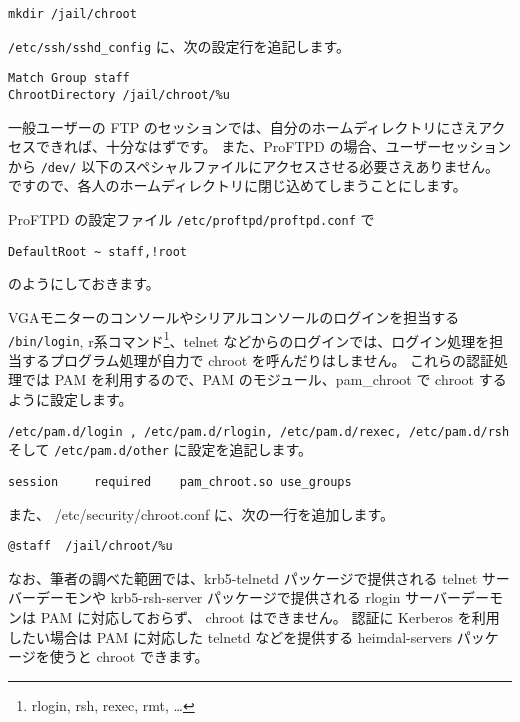 \begin{verbatim}
mkdir /jail/chroot
\end{verbatim}


\label{sec:openssh}

{\tt /etc/ssh/sshd\_config} に、次の設定行を追記します。
\begin{tabbing}
\tt Match \= \tt Group staff \\
\> \tt ChrootDirectory /jail/chroot/\%u
\end{tabbing}



一般ユーザーの FTP のセッションでは、自分のホームディレクトリにさえアクセスできれば、十分なはずです。
また、ProFTPD の場合、ユーザーセッションから {\tt /dev/} 以下のスペシャルファイルにアクセスさせる必要さえありません。
ですので、各人のホームディレクトリに閉じ込めてしまうことにします。

ProFTPD の設定ファイル {\tt /etc/proftpd/proftpd.conf} で
\begin{verbatim}
DefaultRoot	~ staff,!root
\end{verbatim}
のようにしておきます。



\label{sec:pamchroot}

VGAモニターのコンソールやシリアルコンソールのログインを担当する {\tt /bin/login}, r系コマンド\footnote{rlogin, rsh, rexec, rmt, \ldots}、telnet などからのログインでは、ログイン処理を担当するプログラム処理が自力で chroot を呼んだりはしません。
これらの認証処理では PAM を利用するので、PAM のモジュール、pam\_chroot で chroot するように設定します。

 {\tt /etc/pam.d/login , /etc/pam.d/rlogin, /etc/pam.d/rexec, /etc/pam.d/rsh} そして {\tt /etc/pam.d/other} に設定を追記します。

\begin{verbatim}
session		required	pam_chroot.so use_groups
\end{verbatim}


また、 /etc/security/chroot.conf に、次の一行を追加します。
\begin{verbatim}
@staff  /jail/chroot/%u
\end{verbatim}


なお、筆者の調べた範囲では、krb5-telnetd パッケージで提供される telnet サーバーデーモンや krb5-rsh-server パッケージで提供される rlogin サーバーデーモンは PAM に対応しておらず、 chroot はできません。
認証に Kerberos を利用したい場合は PAM に対応した telnetd などを提供する heimdal-servers パッケージを使うと chroot できます。


